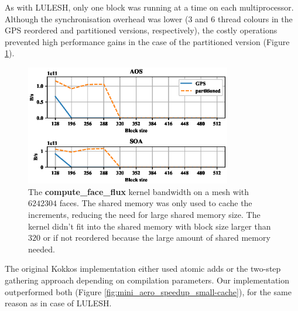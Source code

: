 As with LULESH, only one block was running at a time on each multiprocessor.
Although the synchronisation overhead was lower ($3$ and $6$ thread
colours in the GPS reordered and partitioned versions, respectively), the costly
operations prevented high performance gains in the case of the partitioned
version (Figure \ref{fig:mini_aero_bw_small-cache}).

\begin{figure}[Htbp]
  \centering
  \includegraphics[width=9cm]{fig/mini_aero_bw_small-cache.eps}
  \caption{The \textbf{compute\_face\_flux} kernel bandwidth on a mesh with
  $6242304$ faces. The shared memory was only used to cache the increments,
  reducing the need for large shared memory size. The kernel didn't fit into the
  shared memory with block size larger than $320$ or if not reordered because the
  large amount of shared memory needed.}
  \label{fig:mini_aero_bw_small-cache}
\end{figure}

The original Kokkos implementation either used atomic adds or the two-step
gathering approach depending on compilation parameters. Our implementation
outperformed both (Figure \ref{fig:mini_aero_speedup_small-cache}), for the same
reason as in case of LULESH.

